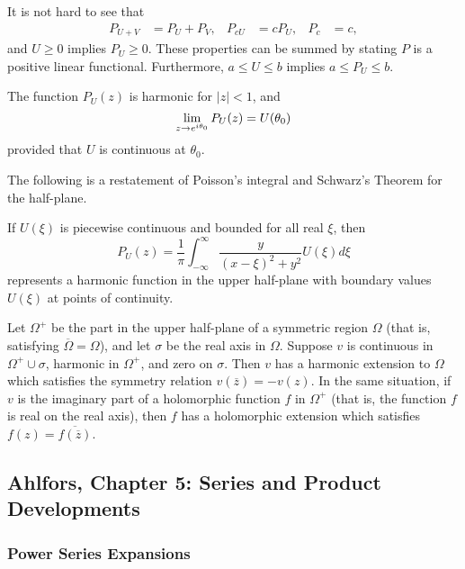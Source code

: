 It is not hard to see that
\begin{align*}
  P_{U+V} &= P_U + P_V, &
  P_{c U} &= c P_U, &
  P_c &= c,
\end{align*}
and $U \geq 0$ implies $P_U \geq 0$. These properties can be summed by stating $P$ is a positive linear functional. Furthermore, $a \leq U \leq b$ implies $a \leq P_U \leq b$.

\begin{theorem}
  The function $P_U(z)$ is harmonic for $|z| < 1$, and
  \[
  \lim_{z \rightarrow e^{i\theta_0}} P_U(z) = U(\theta_0)
  \]
  provided that $U$ is continuous at $\theta_0$.
\end{theorem}

The following is a restatement of Poisson's integral and Schwarz's Theorem for the half-plane.

\begin{theorem}
  If $U(\xi)$ is piecewise continuous and bounded for all real $\xi$, then
  \[
  P_U(z) = \frac{1}{\pi} \int_{-\infty}^\infty \frac{y}{(x-\xi)^2 + y^2} U(\xi) d\xi
  \]
  represents a harmonic function in the upper half-plane with boundary values $U(\xi)$ at points of continuity.
\end{theorem}

\begin{theorem}
  Let $\Omega^+$ be the part in the upper half-plane of a symmetric region $\Omega$ (that is, satisfying $\overline{\Omega} = \Omega$), and let $\sigma$ be the real axis in $\Omega$. Suppose $v$ is continuous in $\Omega^+ \cup \sigma$, harmonic in $\Omega^+$, and zero on $\sigma$. Then $v$ has a harmonic extension to $\Omega$ which satisfies the symmetry relation $v(\overline{z}) = -v(z)$. In the same situation, if $v$ is the imaginary part of a holomorphic function $f$ in $\Omega^+$ (that is, the function $f$ is real on the real axis), then $f$ has a holomorphic extension which satisfies $f(z) = \overline{f(\overline{z})}$.
\end{theorem}

\subsection{Ahlfors, Chapter 5: Series and Product Developments}

\subsubsection{Power Series Expansions}

